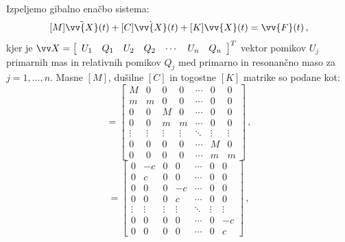         Izpeljemo gibalno enačbo sistema: 
        \begin{equation}\label{eq:gibalna_enacba_MM}
            [M] \ddot{\vv{X}}(t)+[C] \dot{\vv{X}}(t)+[K] \vv{X}(t)=\vv{F}(t) \, ,
        \end{equation}
        kjer je $\vv X=\left[\begin{array}{lllllll}U_1 & Q_1 & U_2 & Q_2 & \cdots & U_n & Q_n\end{array}\right]^T$ vektor pomikov $U_j$ primarnih mas in relativnih pomikov $Q_j$ med primarno in resonančno maso za $j=1, ..., n$. Masne $[M]$, dušilne $[C]$ in togostne $[K]$ matrike so podane kot: 
        \begin{equation}
            [M]=\left[\begin{array}{ccccccc}
            M & 0 & 0 & 0 & \cdots & 0 & 0 \\
            m & m & 0 & 0 & \cdots & 0 & 0 \\
            0 & 0 & M & 0 & \cdots & 0 & 0 \\
            0 & 0 & m & m & \cdots & 0 & 0 \\
            \vdots & \vdots & \vdots & \vdots & \ddots & \vdots & \vdots \\
            0 & 0 & 0 & 0 & \cdots & M & 0 \\
            0 & 0 & 0 & 0 & \cdots & m & m
            \end{array}\right]\,,
        \end{equation}
        \begin{equation}
            [C]=\left[\begin{array}{ccccccc}
            0 & -c & 0 & 0 & \cdots & 0 & 0 \\
            0 & c & 0 & 0 & \cdots & 0 & 0 \\
            0 & 0 & 0 & -c & \cdots & 0 & 0 \\
            0 & 0 & 0 & c & \cdots & 0 & 0 \\
            \vdots & \vdots & \vdots & \vdots & \ddots & \vdots & \vdots \\
            0 & 0 & 0 & 0 & \cdots & 0 & -c \\
            0 & 0 & 0 & 0 & \cdots & 0 & c
            \end{array}\right]\,,
        \end{equation}
